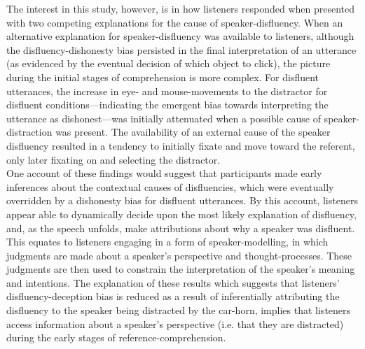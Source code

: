 \documentclass[a4paper,man,natbib]{apa6}
\begin{document}
The interest in this study, however, is in how listeners responded when presented with two competing explanations for the cause of speaker-disfluency. 
When an alternative explanation for speaker-disfluency was available to listeners, although the disfluency-dishonesty bias persisted in the final interpretation of an utterance (as evidenced by the eventual decision of which object to click), the picture during the initial stages of comprehension is more complex. 
For disfluent utterances, the increase in eye- and mouse-movements to the distractor for disfluent conditions---indicating the emergent bias towards interpreting the utterance as dishonest---was initially attenuated when a possible cause of speaker-distraction was present. 
The availability of an external cause of the speaker disfluency resulted in a tendency to initially fixate and move toward the referent, only later fixating on and selecting the distractor. \\

One account of these findings would suggest that participants made early inferences about the contextual causes of disfluencies, which were eventually overridden by a dishonesty bias for disfluent utterances. 
By this account, listeners appear able to dynamically decide upon the most likely explanation of disfluency, and, as the speech unfolds, make attributions about why a speaker was disfluent. 
This equates to listeners engaging in a form of speaker-modelling, in which judgments are made about a speaker's perspective and thought-processes. 
These judgments are then used to constrain the interpretation of the speaker's meaning and intentions.
The explanation of these results which suggests that listeners' disfluency-deception bias is reduced as a result of inferentially attributing the disfluency to the speaker being distracted by the car-horn, implies that listeners access information about a speaker's perspective (i.e. that they are distracted) during the early stages of reference-comprehension. 
\end{document}

